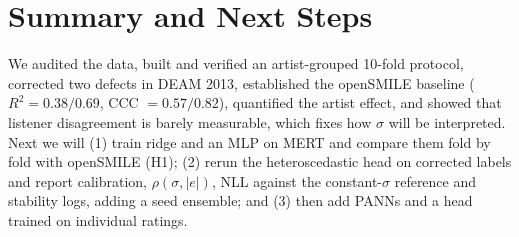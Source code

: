 \documentclass[conference]{IEEEtran}
\newcommand{\R}{R^2}
\begin{document}
\section{Summary and Next Steps}
We audited the data, built and verified an artist-grouped 10-fold protocol,
corrected two defects in DEAM 2013, established the openSMILE baseline
($\R=0.38/0.69$, CCC $=0.57/0.82$), quantified the artist effect, and showed
that listener disagreement is barely measurable, which fixes how $\sigma$ will
be interpreted. Next we will (1) train ridge and an MLP on MERT and compare
them fold by fold with openSMILE (H1); (2) rerun the heteroscedastic head on
corrected labels and report calibration, $\rho(\sigma,|e|)$, NLL against the
constant-$\sigma$ reference and stability logs, adding a seed ensemble; and
(3) then add PANNs and a head trained on individual ratings.



\end{document}
